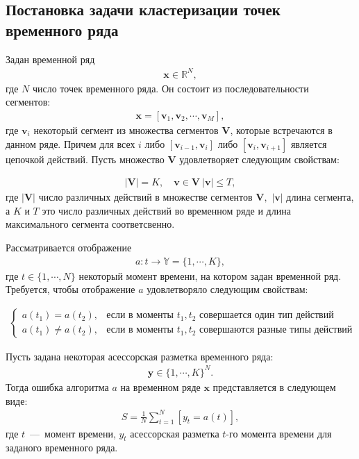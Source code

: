 \subsection{Постановка задачи кластеризации точек временного ряда}

Задан временной ряд
\[
\label{eq:st:1}
\begin{aligned}
\textbf{x} \in \mathbb{R}^{N},
\end{aligned}
\]
где $N$ число точек временного ряда. Он состоит из последовательности сегментов:
\[
\label{eq:st:2}
\begin{aligned}
\textbf{x} = [\textbf{v}_1, \textbf{v}_2, \cdots, \textbf{v}_M],
\end{aligned}
\]
где $\textbf{v}_i$ некоторый сегмент из множества сегментов $\mathbf{V}$, которые встречаются в данном ряде. 
Причем для всех $i$ либо $[\textbf{v}_{i-1},\textbf{v}_{i}]$ либо $[\textbf{v}_{i},\textbf{v}_{i+1}]$  является цепочкой действий. Пусть множество $\mathbf{V}$ удовлетворяет следующим свойствам:

\[
\label{eq:st:3}
\begin{aligned}
\left|\mathbf{V}\right| = K, \quad \textbf{v} \in \mathbf{V}~\left|\textbf{v}\right| \leq T,
\end{aligned}
\]
где $\left|\mathbf{V}\right|$ число различных действий в множестве сегментов $\mathbf{V},$ $\left|\textbf{v}\right|$ длина сегмента, а $K$ и $T$ это число различных действий во временном ряде и длина максимального сегмента соответсвенно.

Рассматривается отображение
\[
\label{eq:st:4}
\begin{aligned}
a : t \to \mathbb{Y} = \{1,\cdots, K\}, 
\end{aligned}
\]
где $t \in \{1,\cdots, N\}$ некоторый момент времени, на котором задан временной ряд.
Требуется, чтобы отображение $a$ удовлетворяло следующим свойствам:

\[
\label{eq:st:5}
\begin{aligned}
\begin{cases}
    a\left(t_1\right) = a\left(t_2\right), &  \text{если в моменты } t_1, t_2 \text{ совершается один тип действий}\\
    a\left(t_1\right) \not= a\left(t_2\right), &  \text{если в моменты } t_1, t_2 \text{ совершаются разные типы действий }
\end{cases}
\end{aligned}
\]

Пусть задана некоторая асессорская разметка временного ряда:
\[
\label{eq:st:6}
\begin{aligned}
\textbf{y} \in \{1,\cdots,K\}^{N}.
\end{aligned}
\]
Тогда ошибка алгоритма $a$ на временном ряде $\textbf{x}$ представляется в следующем виде:
\[
\label{eq:st:7}
\begin{aligned}
S = \frac{1}{N}\sum_{t=1}^{N}[y_t = a\left(t\right)],
\end{aligned}
\]
где $t$~---~момент времени, $y_t$ асессорская разметка $t$-го момента времени для заданого временного ряда.


